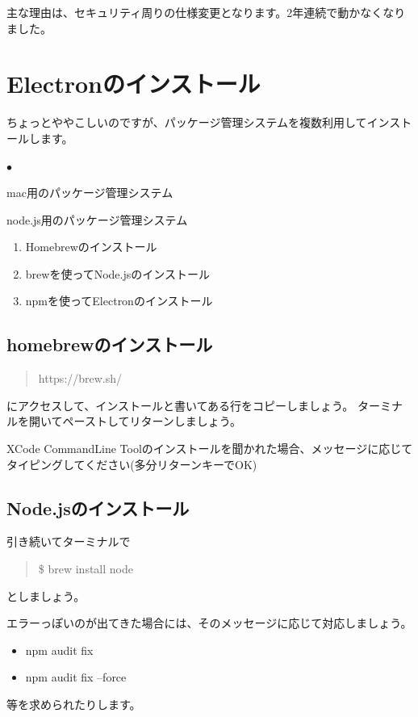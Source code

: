 \documentclass[mingoth,11pt,a4j,uplatex]{jsarticle}
\renewenvironment{description}%
{%
   \begin{list}{\parbox{1zw}{$\bullet$}}%
   {%
      \setlength{\topsep}{1zh}
      \setlength{\itemindent}{3zw}
      \setlength{\leftmargin}{5zw}%
      \setlength{\rightmargin}{0zw}%
      \setlength{\labelsep}{1zw}%
      \setlength{\labelwidth}{3zw}%
      \setlength{\itemsep}{0em}%
      \setlength{\parsep}{0em}%
      \setlength{\listparindent}{0zw}%
   }
}{%
   \end{list}%
}
\begin{document}
主な理由は、セキュリティ周りの仕様変更となります。2年連続で動かなくなりました。

\section{Electronのインストール}
ちょっとややこしいのですが、パッケージ管理システムを複数利用してインストールします。

\begin{description}
\item[Homebrew] mac用のパッケージ管理システム
\item[npm]node.js用のパッケージ管理システム
\end{description}


\begin{enumerate}
\item Homebrewのインストール
\item brewを使ってNode.jsのインストール
\item npmを使ってElectronのインストール
\end{enumerate}

\subsection{homebrewのインストール}
\begin{quote}
https://brew.sh/
\end{quote}
にアクセスして、インストールと書いてある行をコピーしましょう。
ターミナルを開いてペーストしてリターンしましょう。

XCode CommandLine Toolのインストールを聞かれた場合、メッセージに応じてタイピングしてください(多分リターンキーでOK)




\subsection{Node.jsのインストール}
引き続いてターミナルで
\begin{quote}
\$ brew install node
\end{quote}
としましょう。

エラーっぽいのが出てきた場合には、そのメッセージに応じて対応しましょう。

\begin{itemize}
\item npm audit fix
\item npm audit fix --force
\end{itemize}
等を求められたりします。
\end{document}
